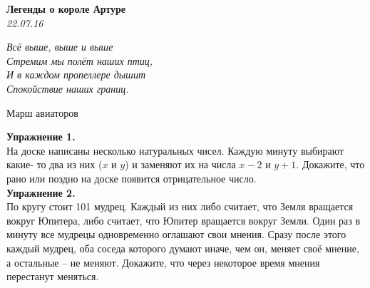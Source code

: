 \begin{center}
\textbf{\Large Легенды о короле Артуре}\\
\textit{22.07.16}
\end{center}

\epigraph{\it Всё выше, выше и выше\\
Стремим мы полёт наших птиц,\\
И в каждом пропеллере дышит\\
Спокойствие наших границ.}{Марш авиаторов}

\textbf{Упражнение 1.}\\
На доске написаны несколько натуральных чисел. Каждую минуту выбирают какие-
то два из них ($x$ и $y$) и заменяют их на числа $x-2$ и $y+1$. Докажите, что рано или поздно на доске появится отрицательное число.\\
\textbf{Упражнение 2.}\\
По кругу стоит 101 мудрец. Каждый из них либо считает, что Земля вращается вокруг Юпитера, либо считает, что Юпитер вращается вокруг Земли. Один раз в минуту все мудрецы одновременно оглашают свои мнения. Сразу после этого каждый мудрец, оба соседа которого думают иначе, чем он, меняет своё мнение, а остальные – не меняют. Докажите, что через некоторое время мнения перестанут меняться.

